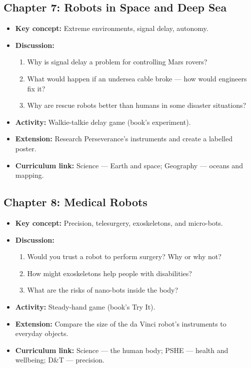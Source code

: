\subsection*{Chapter 7: Robots in Space and Deep Sea}
\begin{itemize}
  \item \textbf{Key concept:} Extreme environments, signal delay, autonomy.
  \item \textbf{Discussion:}
    \begin{enumerate}
      \item Why is signal delay a problem for controlling Mars rovers?
      \item What would happen if an undersea cable broke --- how would engineers fix it?
      \item Why are rescue robots better than humans in some disaster situations?
    \end{enumerate}
  \item \textbf{Activity:} Walkie-talkie delay game (book's experiment).
  \item \textbf{Extension:} Research Perseverance's instruments and create a labelled poster.
  \item \textbf{Curriculum link:} Science --- Earth and space; Geography --- oceans and mapping.
\end{itemize}

\subsection*{Chapter 8: Medical Robots}
\begin{itemize}
  \item \textbf{Key concept:} Precision, telesurgery, exoskeletons, and micro-bots.
  \item \textbf{Discussion:}
    \begin{enumerate}
      \item Would you trust a robot to perform surgery? Why or why not?
      \item How might exoskeletons help people with disabilities?
      \item What are the risks of nano-bots inside the body?
    \end{enumerate}
  \item \textbf{Activity:} Steady-hand game (book's Try It).
  \item \textbf{Extension:} Compare the size of the da Vinci robot's instruments to everyday objects.
  \item \textbf{Curriculum link:} Science --- the human body; PSHE --- health and wellbeing; D\&T --- precision.
\end{itemize}


